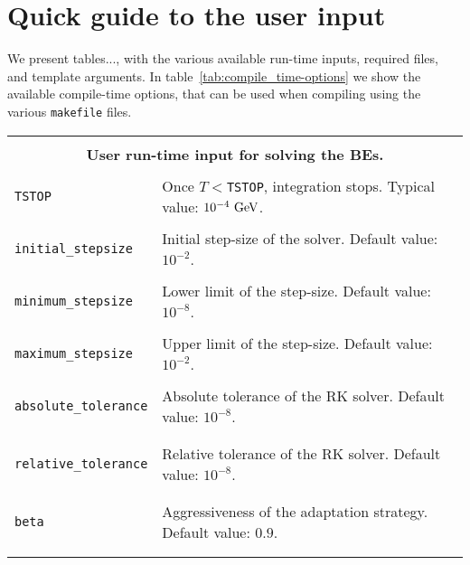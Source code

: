 \documentclass[11pt,a4paper]{article}
\begin{document}
\section{Quick guide to the user input}\label{app:usr_input}
\setcounter{equation}{0}
We present tables..., with the various available run-time inputs, required files, and template arguments. In table~\ref{tab:compile_time-options} we show the available compile-time options, that can be used when compiling using the various {\tt makefile} files. 
%
\begin{table}[h!]
	\centering
	\begin{tabular}{l l}
		\hline\\[-0.4cm]
		\multicolumn{2}{c}{\bf User run-time input for solving the BEs.}  \\
		\hline\\[-0.4cm]


		{\tt TSTOP} & Once $T<${\tt TSTOP}, integration stops. Typical value: $10^{-4}~{\rm GeV}$.\\
		\hline\\[-0.4cm]

		{\tt initial\_stepsize} &  Initial step-size of the solver. Default value: $10^{-2}$.\\ 
		\hline\\[-0.4cm]

		{\tt minimum\_stepsize} & Lower limit of the step-size. Default value:  $10^{-8}$.\\
		\hline\\[-0.4cm]

		{\tt maximum\_stepsize} & Upper limit of the step-size. Default value:  $10^{-2}$.\\
		\hline\\[-0.4cm]

		{\tt absolute\_tolerance} & \multirow{1}{12cm}{Absolute tolerance of the RK solver.  Default value:  $10^{-8}$.}\\\\
		\hline\\[-0.4cm]

		{\tt relative\_tolerance} & \multirow{1}{12cm}{Relative tolerance of the RK solver.  Default value:  $10^{-8}$.}\\\\
		\hline\\[-0.4cm]
		
		{\tt beta} & \multirow{1}{12cm}{Aggressiveness of the adaptation strategy.  Default value:  $0.9$.}\\\\
		\hline\\[-0.4cm]


\end{tabular}
\end{table}
\end{document}
